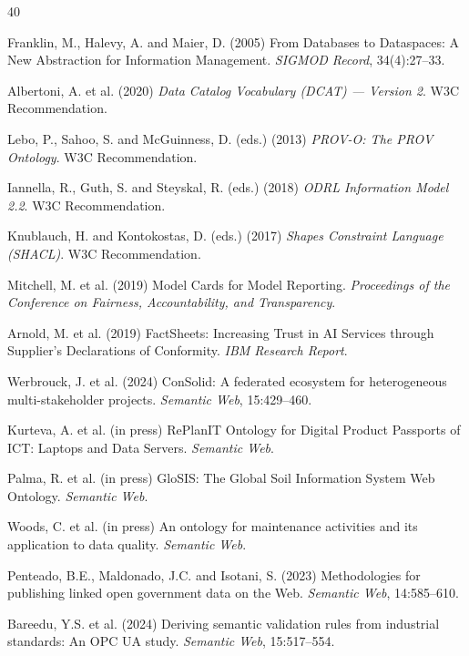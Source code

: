 \documentclass[Afour,sagev,times]{sagej}
\begin{document}
\begin{thebibliography}{40}

 Franklin, M., Halevy, A. and Maier, D. (2005) From Databases to Dataspaces: A New Abstraction for Information Management. \emph{SIGMOD Record}, 34(4):27--33.

 Albertoni, A. et al. (2020) \emph{Data Catalog Vocabulary (DCAT) --- Version 2}. W3C Recommendation.

 Lebo, P., Sahoo, S. and McGuinness, D. (eds.) (2013) \emph{PROV-O: The PROV Ontology}. W3C Recommendation.

 Iannella, R., Guth, S. and Steyskal, R. (eds.) (2018) \emph{ODRL Information Model 2.2}. W3C Recommendation.

 Knublauch, H. and Kontokostas, D. (eds.) (2017) \emph{Shapes Constraint Language (SHACL)}. W3C Recommendation.

 Mitchell, M. et al. (2019) Model Cards for Model Reporting. \emph{Proceedings of the Conference on Fairness, Accountability, and Transparency}.

 Arnold, M. et al. (2019) FactSheets: Increasing Trust in AI Services through Supplier's Declarations of Conformity. \emph{IBM Research Report}.

 Werbrouck, J. et al. (2024) ConSolid: A federated ecosystem for heterogeneous multi-stakeholder projects. \emph{Semantic Web}, 15:429--460.

 Kurteva, A. et al. (in press) RePlanIT Ontology for Digital Product Passports of ICT: Laptops and Data Servers. \emph{Semantic Web}.

 Palma, R. et al. (in press) GloSIS: The Global Soil Information System Web Ontology. \emph{Semantic Web}.

 Woods, C. et al. (in press) An ontology for maintenance activities and its application to data quality. \emph{Semantic Web}.

 Penteado, B.E., Maldonado, J.C. and Isotani, S. (2023) Methodologies for publishing linked open government data on the Web. \emph{Semantic Web}, 14:585--610.

 Bareedu, Y.S. et al. (2024) Deriving semantic validation rules from industrial standards: An OPC UA study. \emph{Semantic Web}, 15:517--554.


\end{thebibliography}
\end{document}
